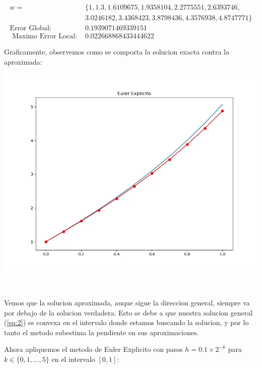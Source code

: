 \documentclass[11pt]{article}
\makeatletter
\def\maxwidth{\ifdim\Gin@nat@width>\linewidth\linewidth
    \else\Gin@nat@width\fi}
\let\Oldincludegraphics\includegraphics
\renewcommand{\includegraphics}[1]{\Oldincludegraphics[width=.8\maxwidth]{#1}}
\makeatother
\begin{document}
\begin{align*}
 w =&\{ 
1, 1.3, 1.6109675, 1.9358104, 2.2775551, 2.6393746,\\ 
&3.0246182, 3.4368423, 3.8798436, 4.3576938, 4.8747771\}\\
 \text{Error Global: } &0.1939071469339151\\
\text{ Maximo Error Local: } &0.022668868433444622
\end{align*}
    

    Graficamente, observemos como se comporta la solucion exacta contra la
aproximada:
    \begin{center}
    \includegraphics{fig 1.1.png}
    \end{center}
    { \hspace*{\fill} \\}
    
    Vemos que la solucion aproximada, auque sigue la direccion general,
siempre va por debajo de la solucion verdadera. Esto se debe a que
nuestra solucion general (\ref{eq:2}) es convexa en el intervalo donde
estamos buscando la solucion, y por lo tanto el metodo subestima la
pendiente en sus aproximaciones.

Ahora apliquemos el metodo de Euler Explicito con pasos
\(h = 0.1 \times 2^{-k}\) para \(k \in \{0,1,\dots, 5\}\) en el
intervalo \([0,1]\):
\end{document}
